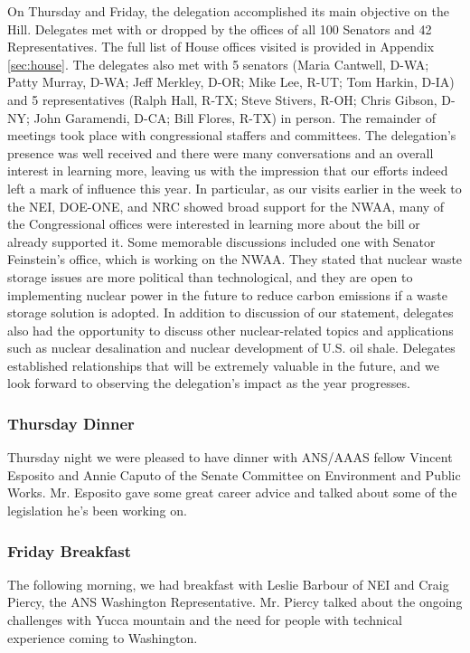 On Thursday and Friday, the delegation accomplished its main objective on the
Hill. Delegates met with or dropped by the offices of all 100 Senators and 42
Representatives. The full list of House offices visited is provided in Appendix
\ref{sec:house}. The delegates also met with 5 senators (Maria Cantwell, D-WA;
Patty Murray, D-WA; Jeff Merkley, D-OR; Mike Lee, R-UT; Tom Harkin, D-IA) and 5
representatives (Ralph Hall, R-TX; Steve Stivers, R-OH; Chris Gibson, D-NY; John
Garamendi, D-CA; Bill Flores, R-TX) in person. The remainder of meetings took
place with congressional staffers and committees. The delegation's presence was
well received and there were many conversations and an overall interest in
learning more, leaving us with the impression that our efforts indeed left a
mark of influence this year. In particular, as our visits earlier in the week to
the NEI, DOE-ONE, and NRC showed broad support for the NWAA, many of the
Congressional offices were interested in learning more about the bill or already
supported it. Some memorable discussions included one with Senator Feinstein's
office, which is working on the NWAA. They stated that nuclear waste storage
issues are more political than technological, and they are open to implementing
nuclear power in the future to reduce carbon emissions if a waste storage
solution is adopted. In addition to discussion of our statement, delegates also
had the opportunity to discuss other nuclear-related topics and applications
such as nuclear desalination and nuclear development of U.S. oil
shale. Delegates established relationships that will be extremely valuable in
the future, and we look forward to observing the delegation's impact as the year
progresses.

\subsubsection*{Thursday Dinner}

Thursday night we were pleased to have dinner with ANS/AAAS fellow Vincent
Esposito and Annie Caputo of the Senate Committee on Environment and Public
Works. Mr. Esposito gave some great career advice and talked about some of the
legislation he's been working on.  

\subsubsection*{Friday Breakfast}

The following morning, we had breakfast with Leslie Barbour of NEI and Craig
Piercy, the ANS Washington Representative. Mr. Piercy talked about the ongoing
challenges with Yucca mountain and the need for people with technical experience
coming to Washington.
